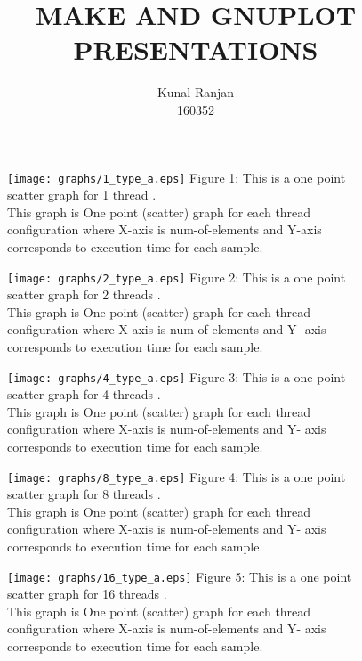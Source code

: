\documentclass{article}
\title{MAKE AND GNUPLOT PRESENTATIONS}
\author{Kunal Ranjan \\ 160352}
\begin{document}
\maketitle
\begin{figure}
\centering
\texttt{[image: graphs/1\_type\_a.eps]}  \newline
\vspace{5 cm}
 Figure 1: This is a one point scatter graph for 1 thread . \\
 \vspace{0.4 cm}
 \vspace{30 pt}
This graph is One point (scatter) graph for each thread configuration where X-axis is num-of-elements and Y-axis corresponds to execution time for each sample. 
 \end{figure}
 
\begin{figure}
\centering
\texttt{[image: graphs/2\_type\_a.eps]} \newline
\vspace{5 cm}
Figure 2: This is a one point scatter graph for 2 threads .\\
\vspace{30 pt}
\vspace{0.4 cm}
 This graph is One point (scatter) graph for each thread configuration where X-axis is num-of-elements and Y-
axis corresponds to execution time for each sample. 
\end{figure}
\begin{figure}
\centering
\texttt{[image: graphs/4\_type\_a.eps]}\newline
\vspace{60 pt}
 Figure 3: This is a one point scatter graph for 4 threads .\\
 \vspace{0.4 cm}
 This graph is One point (scatter) graph for each thread configuration where X-axis is num-of-elements and Y-
axis corresponds to execution time for each sample. 
\end{figure}
\begin{figure}
\centering
\texttt{[image: graphs/8\_type\_a.eps]}\newline
\vspace{60 pt}
Figure 4: This is a one point scatter graph for 8 threads .\\
\vspace{0.4 cm}
This graph is One point (scatter) graph for each thread configuration where X-axis is num-of-elements and Y-
axis corresponds to execution time for each sample. 
\end{figure}
\begin{figure}
\centering
\texttt{[image: graphs/16\_type\_a.eps]}\newline
\vspace{60 pt}
 Figure 5: This is a one point scatter graph for 16 threads .\\
 \vspace{0.4 cm}
This graph is One point (scatter) graph for each thread configuration where X-axis is num-of-elements and Y-
axis corresponds to execution time for each sample. 
\end{figure}
\end{document}
